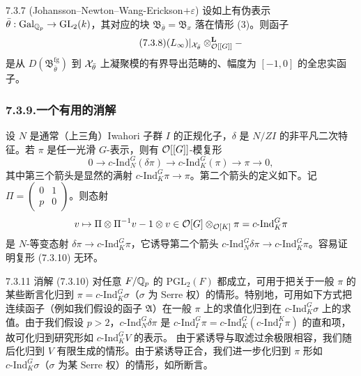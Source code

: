 \begin{thm}{7.3.7 (Johansson--Newton--Wang-Erickson$+\varepsilon$)}\label{thm:a4-7-3-7}
设如上有伪表示 $\bar\theta:\operatorname{Gal}_{\mathbb{Q}_p}\to\mathrm{GL}_2(k)$，其对应的块 $\mathfrak B_{\bar\theta}=\mathfrak B_x$ 落在情形 (3)。则函子
\begin{equation}\tag{7.3.8}\label{eq:a4-7-3-8}
(L_\infty)|_{\mathcal{X}_{\bar\theta}}\otimes^{\mathbf L}_{\mathcal{O}[[G]]}-
\end{equation}
是从 $D(\mathfrak B^{\mathrm{fg}}_{\bar\theta})$ 到 $\mathcal{X}_{\bar\theta}$ 上凝聚模的有界导出范畴的、幅度为 $[-1,0]$ 的全忠实函子。
\end{thm}

\subsubsection*{7.3.9.\quad 一个有用的消解}
设 $N$ 是通常（上三角）Iwahori 子群 $I$ 的正规化子，$\delta$ 是 $N/ZI$ 的非平凡二次特征。若 $\pi$ 是任一光滑 $G$-表示，则有 $\mathcal{O}[[G]]$-模复形
\begin{equation}\tag{7.3.10}\label{eq:a4-7-3-10}
0\to c\text{-Ind}_N^G(\delta\pi)\to c\text{-Ind}_K^G(\pi)\to\pi\to0,
\end{equation}
其中第三个箭头是显然的满射 $c\text{-Ind}_K^G\pi\to\pi$。第二个箭头的定义如下。记 $\Pi=\begin{pmatrix}0&1\\p&0\end{pmatrix}$。则态射
\[
v\mapsto\Pi\otimes\Pi^{-1}v-1\otimes v\in\mathcal{O}[G]\otimes_{\mathcal{O}[K]}\pi=c\text{-Ind}_K^G\pi
\]
是 $N$-等变态射 $\delta\pi\to c\text{-Ind}_K^G\pi$，它诱导第二个箭头 $c\text{-Ind}_N^G\delta\pi\to c\text{-Ind}_K^G\pi$。容易证明复形 (7.3.10) 无环。

\begin{rem}{7.3.11}\label{thm:a4-7-3-11}
消解 (7.3.10) 对任意 $F/\mathbb{Q}_p$ 的 $\mathrm{PGL}_2(F)$ 都成立，可用于把关于一般 $\pi$ 的某些断言化归到 $\pi=c\text{-Ind}_K^G\sigma$（$\sigma$ 为 Serre 权）的情形。特别地，可用如下方式把连续函子（例如我们假设的函子 $\mathfrak A$）在一般 $\pi$ 上的求值化归到在 $c\text{-Ind}_K^G\sigma$ 上的求值。由于我们假设 $p>2$，$c\text{-Ind}_N^G\delta\pi$ 是 $c\text{-Ind}_I^G\pi=c\text{-Ind}_K^G(c\text{-Ind}_I^K\pi)$ 的直和项，故可化归到研究形如 $c\text{-Ind}_K^GV$ 的表示。
由于紧诱导与取滤过余极限相容，我们随后化归到 $V$ 有限生成的情形。由于紧诱导正合，我们进一步化归到 $\pi$ 形如 $c\text{-Ind}_K^G\sigma$（$\sigma$ 为某 Serre 权）的情形，如所断言。
\end{rem}

